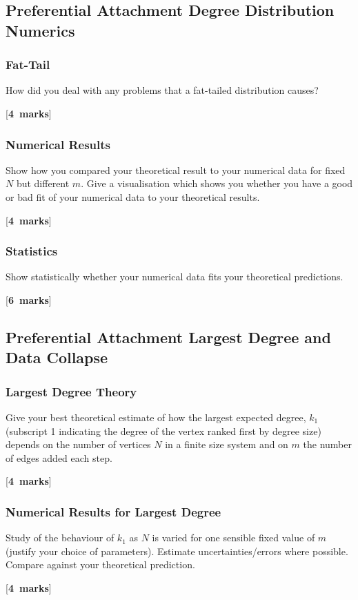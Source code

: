 \documentclass[a4paper,12pt]{article}
\newcounter{nmarks}
\newcommand{\qmarks}[1]{\addtocounter{nmarks}{#1} }
\renewcommand{\qmarks}[1]{\addtocounter{nmarks}{#1} \hspace*{\fill} [\textbf{#1~marks}]}
\begin{document}
\subsection{Preferential Attachment Degree Distribution Numerics}

\subsubsection{Fat-Tail}
How did you deal with any problems that a fat-tailed distribution causes? \qmarks{4}

\subsubsection{Numerical Results}
Show how you compared your theoretical result to your numerical data for fixed $N$ but different $m$.
Give a visualisation which shows you whether you have a good or bad fit of your numerical data to your theoretical results.
\qmarks{4}

\subsubsection{Statistics}
Show statistically whether your numerical data fits your theoretical predictions. \qmarks{6}


\subsection{Preferential Attachment Largest Degree and Data Collapse}


\subsubsection{Largest Degree Theory}
Give your best theoretical estimate of how the largest expected degree, $k_\mathrm{1}$ (subscript 1 indicating the degree of the vertex ranked first by degree size) depends on the number of vertices $N$ in a finite size system and on $m$ the number of edges added each step. \qmarks{4}

\subsubsection{Numerical Results for Largest Degree}
Study of the behaviour of $k_1$ as $N$ is varied for one sensible fixed value of $m$ (justify your choice of parameters). Estimate uncertainties/errors where possible. Compare against your theoretical prediction. \qmarks{4}
\end{document}
